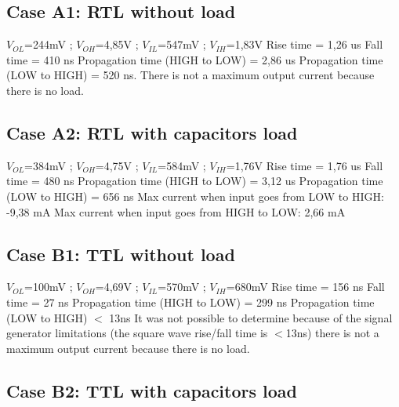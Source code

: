 \subsection*{Case A1: RTL without load}
$V_{OL}$=244mV ;
$V_{OH}$=4,85V ; 
$V_{IL}$=547mV ;
$V_{IH}$=1,83V
\newline
Rise time = 1,26 us 
\newline
Fall time = 410 ns 
\newline 
Propagation time (HIGH to LOW) = 2,86 us 
\newline
Propagation time (LOW to HIGH) = 520 ns.
\newline
There is not a maximum output current because there is no load.

\subsection*{Case A2: RTL with capacitors load} 

$V_{OL}$=384mV ; 
$V_{OH}$=4,75V ; 
$V_{IL}$=584mV ;
$V_{IH}$=1,76V 
\newline
Rise time = 1,76 us
\newline
Fall time = 480 ns
\newline
Propagation time (HIGH to LOW) = 3,12 us
\newline
Propagation time (LOW to HIGH) = 656 ns
\newline
Max current when input goes from LOW to HIGH: -9,38 mA
\newline
Max current when input goes from HIGH to LOW: 2,66 mA
\subsection*{Case B1: TTL without load}
$V_{OL}$=100mV ; 
$V_{OH}$=4,69V ; 
$V_{IL}$=570mV ; 
$V_{IH}$=680mV 
\newline
Rise time = 156 ns
\newline
Fall time = 27 ns
\newline
Propagation time (HIGH to LOW) = 299 ns
\newline
Propagation time (LOW to HIGH) $<$ 13ns
\newline
It was not possible to determine because of the signal generator limitations
(the square wave rise/fall time is $<$13ns)
there is not a maximum output current because there is no load. 

\subsection*{Case B2: TTL with capacitors load} 

